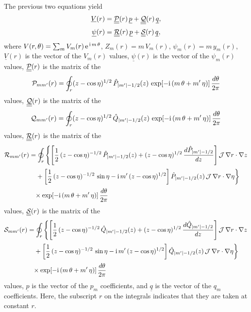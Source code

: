 \documentclass[12pt,prb,aps]{revtex4-1}
\begin{document}
The previous two equations yield\,\cite{tj1}
\begin{align}\label{e32ay}
\underline{V}(r)&= \underline{\underline{{\cal P}}}(r)\,\underline{p}+ \underline{\underline{{\cal Q}}}(r)\,\underline{q},\\[0.5ex]
\underline{\psi}(r)&= \underline{\underline{{\cal R}}}(r)\,\underline{p}+ \underline{\underline{{\cal S}}}(r)\,\underline{q},\label{e33ay}
\end{align}
where $V(r,\theta)= \sum_m V_m(r)\,{\rm e}^{\,{\rm i}\,m\,\theta}$, $Z_m(r)=m\,V_m(r)$, $\psi_m(r)=m\,y_m(r)$, 
 $\underline{V}(r)$ is the vector of the $V_m(r)$ values, $\underline{\psi}(r)$ is the vector of the $\psi_m(r)$ values, $\underline{\underline{{\cal P}}}(r)$ is the
matrix of the
\begin{equation}
{\cal P}_{mm'}(r)=\oint_{r}(z-\cos\eta)^{1/2}\,\hat{P}_{|m'|-1/2}(z)\,\exp[-{\rm i}\,(m\,\theta+m'\,\eta)]\,\frac{d\theta}{2\pi}
\end{equation}
values, 
$\underline{\underline{{\cal Q}}}(r)$ is the
matrix of the
\begin{equation}
{\cal Q}_{mm'}(r)=\oint_{r}(z-\cos\eta)^{1/2}\,\hat{Q}_{|m'|-1/2}(z)\,\exp[-{\rm i}\,(m\,\theta+m'\,\eta)]\,\frac{d\theta}{2\pi}
\end{equation}
values, $\underline{\underline{{\cal R}}}(r)$ is the matrix of the 
\begin{align}\label{e354}
{\cal R}_{mm'}(r) &=\oint_{r}
\left\{\left[\frac{1}{2}\,(z-\cos\eta)^{-1/2}\,\hat{P}_{|m'|-1/2}(z)+(z-\cos\eta)^{1/2}\,\frac{d\hat{P}_{|m'|-1/2}}{dz}\right]{\cal J}\,\nabla r\cdot \nabla z
\right.\nonumber\\[0.5ex]&
\left.\phantom{=}+\left[\frac{1}{2}\,(z-\cos\eta)^{-1/2}\,\sin\eta-{\rm i}\,m'\,(z-\cos\eta)^{1/2}\right]\hat{P}_{|m'|-1/2}(z)\,{\cal J}\,\nabla r\cdot \nabla \eta
\right\}\nonumber\\[0.5ex] &
\phantom{=}\times\exp[-{\rm i}\,(m\,\theta+m'\,\eta)]\,\frac{d\theta}{2\pi}
\end{align}
values, 
$\underline{\underline{{\cal S}}}(r)$ is the matrix of the 
\begin{align}\label{e355}
{\cal S}_{mm'}(r) &=\oint_{r}
\left\{\left[\frac{1}{2}\,(z-\cos\eta)^{-1/2}\,\hat{Q}_{|m'|-1/2}(z)+(z-\cos\eta)^{1/2}\,\frac{d\hat{Q}_{|m'|-1/2}}{dz}\right]{\cal J}\,\nabla r\cdot \nabla z
\right.\nonumber\\[0.5ex]&
\left.\phantom{=}+\left[\frac{1}{2}\,(z-\cos\eta)^{-1/2}\,\sin\eta-{\rm i}\,m'\,(z-\cos\eta)^{1/2}\right]\hat{Q}_{|m'|-1/2}(z)\,{\cal J}\,\nabla r\cdot \nabla \eta
\right\}\nonumber\\[0.5ex] &
\phantom{=}\times\exp[-{\rm i}\,(m\,\theta+m'\,\eta)]\,\frac{d\theta}{2\pi}
\end{align}
values, $\underline{p}$ is the vector of the $p_m$ coefficients, and  $\underline{q}$ is the vector of the $q_m$ coefficients. Here, the
subscript $r$ on the integrals indicates that they are taken at constant $r$. 
\end{document}
